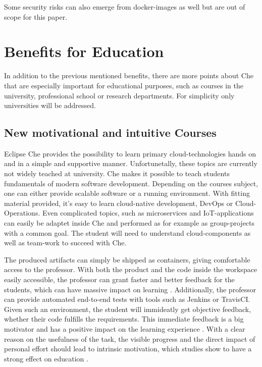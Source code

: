 \documentclass[utf8]{lni}
\begin{document}
Some security risks can also emerge from docker-images as well \cite{PE13} but are out of scope for this paper.

\section{Benefits for Education}
\label{sec:EvalEdu}
In addition to the previous mentioned benefits, there are more points about Che that are especially important for educational purposes, such as courses in the university, professional school or research departments.
For simplicity only universities will be addressed.
\subsection{New motivational and intuitive Courses}
Eclipse Che provides the possibility to learn primary cloud-technologies hands on and in a simple and supportive manner. 
Unfortunetally, these topics are currently not widely teached at university.
Che makes it possible to teach students fundamentals of modern software development.
Depending on the courses subject, one can either provide scalable software or a running environment. 
With fitting material provided, it's easy to learn cloud-native development, DevOps or Cloud-Operations. 
Even complicated topics, such as microservices and IoT-applications can easily be adaptet inside Che \cite{IV18} and performed as for example as group-projects with a common goal. 
The student will need to understand cloud-components as well as team-work to succeed with Che. 

The produced artifacts can simply be shipped as containers, giving comfortable access to the professor. 
With both the product and the code inside the workspace easily accessible, the professor can grant faster and better feedback for the students, which can have massive impact on learning \cite{HU95}\cite{HU18}.
Additionally, the professor can provide automated end-to-end tests with tools such as Jenkins or TravisCI. 
Given such an environment, the student will immideatly get objective feedback, whether their code fulfills the requirements. 
This immediate feedback is a big motivator and has a positive impact on the learning experience \cite{FI05}. 
With a clear reason on the usefulness of the task, the visible progress and the direct impact of personal effort should lead to intrinsic motivation, which studies show to have a strong effect on education \cite{DECI93}. 
\end{document}
